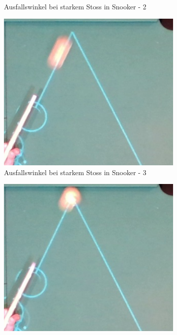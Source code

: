 \begin{figure}[h!]
\begin{subfigure}[b]{0.2\textwidth}
        \caption{Ausfallswinkel bei starkem Stoss in Snooker - 2}
        \label{fig:rebound_angle_fast_snooker_2}
    \end{subfigure}
    \hfill
    \begin{subfigure}[b]{0.2\textwidth}
        \centering
        \includegraphics[width=1.0\linewidth]{../common/04_results/resources/simulation/rebound_angle_fast_snooker/00_rail_rebound_angle_fast_snooker_03.png}
        \caption{Ausfallswinkel bei starkem Stoss in Snooker - 3}
        \label{fig:rebound_angle_fast_snooker_3}
    \end{subfigure}
    \hfill
    \begin{subfigure}[b]{0.2\textwidth}
        \centering
        \includegraphics[width=1.0\linewidth]{../common/04_results/resources/simulation/rebound_angle_fast_snooker/00_rail_rebound_angle_fast_snooker_04.png}

\end{subfigure}
\end{figure}
